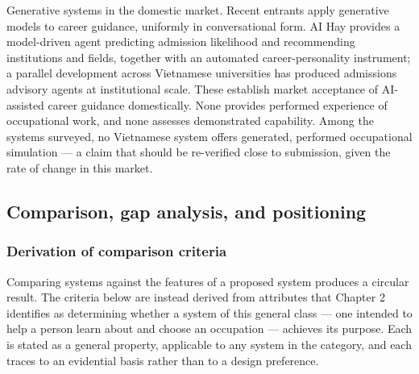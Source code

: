 Generative systems in the domestic market. Recent entrants apply generative models to career guidance, uniformly in conversational form. AI Hay\cite{r94} provides a model-driven agent predicting admission likelihood and recommending institutions and fields, together with an automated career-personality instrument; a parallel development across Vietnamese universities has produced admissions advisory agents at institutional scale. These establish market acceptance of AI-assisted career guidance domestically. None provides performed experience of occupational work, and none assesses demonstrated capability. Among the systems surveyed, no Vietnamese system offers generated, performed occupational simulation --- a claim that should be re-verified close to submission, given the rate of change in this market.

\subsection{Comparison, gap analysis, and positioning}

\subsubsection{Derivation of comparison criteria}

Comparing systems against the features of a proposed system produces a circular result. The criteria below are instead derived from attributes that Chapter 2 identifies as determining whether a system of this general class --- one intended to help a person learn about and choose an occupation --- achieves its purpose. Each is stated as a general property, applicable to any system in the category, and each traces to an evidential basis rather than to a design preference.

